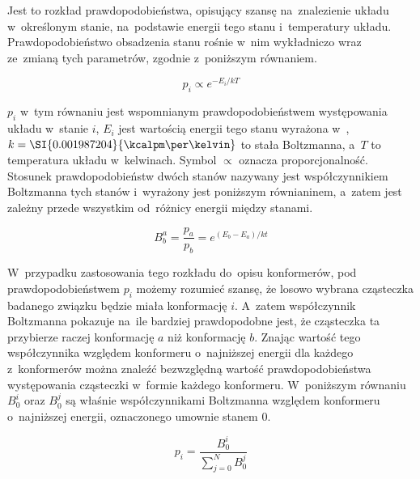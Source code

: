 Jest to rozkład prawdopodobieństwa, opisujący szansę na~znalezienie układu w~określonym stanie,
  na~podstawie energii tego stanu i~temperatury układu.
Prawdopodobieństwo obsadzenia stanu rośnie w~nim wykładniczo wraz ze~zmianą tych parametrów,
  zgodnie z~poniższym równaniem.

\begin{equation}
  p_i \propto e^{-E_i/kT}
\end{equation}

$p_i$ w~tym równaniu jest wspomnianym prawdopodobieństwem występowania układu w~stanie $i$,
  $E_i$ jest wartością energii tego stanu wyrażona w~\si{\kcalpm},
  $k = \SI{0.001987204}{\kcalpm\per\kelvin}$ to stała Boltzmanna,
  a~$T$ to temperatura układu w~kelwinach.
Symbol $\propto$ oznacza proporcjonalność.
Stosunek prawdopodobieństw dwóch stanów nazywany jest współczynnikiem Boltzmanna tych stanów
  i~wyrażony jest poniższym równianinem, a~zatem jest zależny przede wszystkim od~różnicy
  energii między stanami.

\begin{equation}
  B^a_b = \frac{p_a}{p_b} = e^{(E_b-E_a)/kt}
\end{equation}

W~przypadku zastosowania tego rozkładu do~opisu konformerów, pod prawdopodobieństwem $p_i$
  możemy rozumieć szansę, że losowo wybrana cząsteczka badanego związku będzie miała
  konformację $i$.
A~zatem współczynnik Boltzmanna pokazuje na~ile bardziej prawdopodobne jest, że cząsteczka
  ta przybierze raczej konformację $a$ niż konformację $b$.
Znając wartość tego współczynnika względem konformeru o~najniższej energii dla każdego
  z~konformerów można znaleźć bezwzględną wartość prawdopodobieństwa występowania cząsteczki
  w~formie każdego konformeru.
W~poniższym równaniu $B^i_0$ oraz $B^j_0$ są właśnie współczynnikami Boltzmanna względem
  konformeru o~najniższej energii, oznaczonego umownie stanem $0$.

\begin{equation}
  p_i = \frac{B^i_0}{\sum\limits^N_{j=0}B^j_0}
\end{equation}

